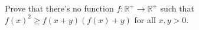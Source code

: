 Prove that there's no function \(f\colon  \mathbb{R}^+\to\mathbb{R}^+\) such that \(f(x)^2\ge f(x+y)\left(f(x)+y\right)\) for all \(x,y>0\).